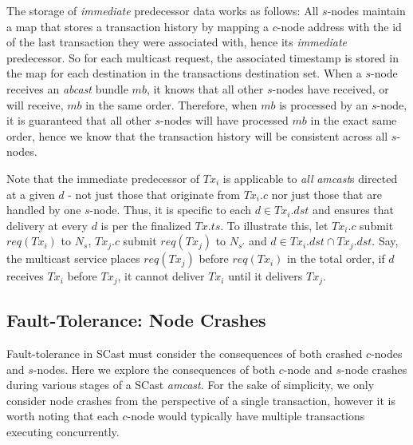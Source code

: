\begin{description}
		The storage of \emph{immediate} predecessor data works as follows: All $s$-nodes maintain a map that stores a transaction history by mapping a $c$-node address with the id of the last transaction they were associated with, hence its \emph{immediate} predecessor.  So for each multicast request, the associated timestamp is stored in the map for each destination in the transactions destination set. When a $s$-node receives an \emph{abcast} bundle $mb$, it knows that all other $s$-nodes have received, or will receive, $mb$ in the same order.  Therefore, when $mb$ is processed by an $s$-node, it is guaranteed that all other $s$-nodes will have processed $mb$ in the exact same order, hence we know that the transaction history will be consistent across all $s$-nodes.  
		
		Note that the immediate predecessor of $Tx_i$ is applicable to \emph{all} \emph{amcast}s directed at a given $d$ - not just those that originate from $Tx_i.c$ nor just those that are handled by one $s$-node. Thus, it is specific to each $d \in Tx_i.dst$ and ensures that delivery at every $d$ is per the finalized $Tx.ts$.  To illustrate this, let $Tx_i.c$ submit $req(Tx_i)$ to $N_s$, $Tx_j.c$ submit $req(Tx_j)$ to $N_{s'}$ and $d \in Tx_i.dst \cap Tx_j.dst$. Say, the multicast service places $req(Tx_j)$ before $req(Tx_i)$ in the total order, if $d$ receives $Tx_i$ before $Tx_j$, it cannot deliver $Tx_i$ until it delivers $Tx_j$.
    \end{description}

	\subsection{Fault-Tolerance: Node Crashes}\label{ssec:scast_fault_tolerance}
	Fault-tolerance in \textsf{SCast} must consider the consequences of both crashed $c$-nodes and $s$-nodes.  Here we explore the consequences of both $c$-node and $s$-node crashes during various stages of a \textsf{SCast} \emph{amcast}.  For the sake of simplicity, we only consider node crashes from the perspective of a single transaction, however it is worth noting that each $c$-node would typically have multiple transactions executing concurrently.  
	
